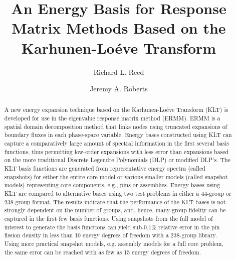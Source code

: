 \documentclass[5p,times,twocolumn,10pt]{elsarticle}
\begin{document}
    \begin{frontmatter}

        \title{An Energy Basis for Response Matrix Methods Based on the
            Karhunen-Lo\'{e}ve Transform}


        \author{Richard L. Reed}
        \author{Jeremy A. Roberts}


        \address{Department of Mechanical and Nuclear Engineering, Kansas State
            University}

        \begin{abstract}
            A new energy expansion technique based on the
            Karhunen-Lo\'{e}ve Transform (KLT) is developed for use in the
            eigenvalue response matrix method (ERMM).  ERMM is a spatial domain
            decomposition method that links nodes using truncated expansions of
            boundary fluxes in each phase-space variable.  Energy bases
            constructed using KLT can capture a comparatively large amount of
            spectral information in the first several basis functions, thus
            permitting low-order expansions with less error than expansions
            based on the more traditional Discrete Legendre Polynomials (DLP)
            or modified DLP's. The KLT basis functions are generated from
            representative energy spectra (called snapshots) for either the
            entire core model or various smaller models (called snapshot
            models) representing core
            components, e.g., pins or assemblies. Energy bases using KLT are
            compared to alternative bases using two test problems in either a
            44-group or 238-group format.  The results indicate that the
            performance of the KLT bases is not strongly dependent on the number
            of groups, and, hence, many-group fidelity can be captured in the
            first few basis functions. Using snapshots from the full model of
            interest to generate the basis functions can
            yield sub-$0.1\%$ relative error in the pin fission density in less
            than 10 energy degrees of freedom with a 238-group library.  Using
            more practical snapshot models, e.g. assembly models for a full
            core problem, the same error can be reached with as few
            as 15 energy degrees of freedom.
        \end{abstract}


\end{frontmatter}
\end{document}
